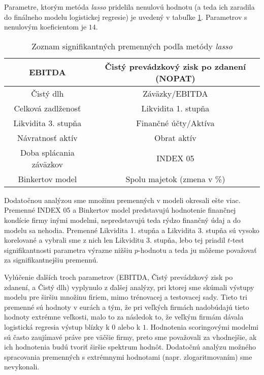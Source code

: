 Parametre, ktorým metóda \emph{lasso} pridelila nenulovú hodnotu (a teda ich zaradila do finálneho modelu logistickej regresie) je uvedený v tabuľke \ref{lasso tabulka vsetky parametre}.
Parametrov s nenulovým koeficientom je \(14\).

\begin{table}
    \begin{tabular}{ |c|c| }
        \hline
        EBITDA & Čistý prevádzkový zisk po zdanení (NOPAT) \\
        \hline
        Čistý dlh & Záväzky/EBITDA \\
        \hline
        Celková zadlženosť & Likvidita 1. stupňa\\
        \hline
        Likvidita 3. stupňa & Finančné účty/Aktíva \\
        \hline
        Návratnosť aktív & Obrat aktív \\
        \hline
        Doba splácania záväzkov & INDEX 05 \\
        \hline
        Binkertov model & Spolu majetok (zmena v \%) \\
        \hline
    \end{tabular}
    \caption{Zoznam signifikantných premenných podľa metódy \emph{lasso}}
    \label{lasso tabulka vsetky parametre}
\end{table}

Dodatočnou analýzou sme množinu premenných v modeli okresali ešte viac.
Premenné INDEX 05 a Binkertov model predstavujú hodnotenie finančnej kondície firmy inými modelmi, nepredstavujú teda rýdzo finančný údaj a do modelu sa nehodia.
Premenné Likvidita 1. stupňa a Likvidita 3. stupňa sú vysoko korelované a vybrali sme z nich len Likviditu 3. stupňa,
lebo tej priadil \(t\)-test signifikantnosti parametra výrazne nižšiu \(p\)-hodnotu a teda ju môžeme považovať za signifikantnejšiu premennú.

Vylúčenie ďalších troch parametrov (EBITDA, Čistý prevádzkový zisk po zdanení, a Čistý dlh) vyplynulo z ďalšej analýzy,
pri ktorej sme skúmali výstupy modelu pre širšiu množinu firiem, mimo trénovacej a testovacej sady.
Tieto tri premenné sú hodnoty v eurách a tým, že pri veľkých firmách nadobúdajú tieto hodnoty extrémne veľkosti,
malo to za následok to, že veľkým firmám dávala logistická regresia výstup blízky k \(0\) alebo k \(1\).
Hodnotenia scoringovými modelmi sú často zaujímavé práve pre väčšie firmy, preto sme považovali za vhodnejšie, ak ich hodnotenia budú tvoriť širšie spektrum hodnôt.
Dodatočnú analýzu možného spracovania premenných s extrémnymi hodnotami (napr. zlogaritmovaním) sme nevykonali.


